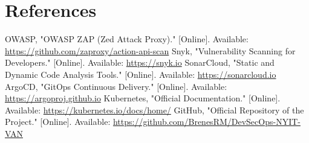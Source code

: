 \documentclass[conference]{IEEEtran}
\begin{document}
\section{References}
\begin{thebibliography}{1}
     OWASP, "OWASP ZAP (Zed Attack Proxy)." [Online]. Available: \url{https://github.com/zaproxy/action-api-scan}
     Snyk, "Vulnerability Scanning for Developers." [Online]. Available: \url{https://snyk.io}
     SonarCloud, "Static and Dynamic Code Analysis Tools." [Online]. Available: \url{https://sonarcloud.io}
     ArgoCD, "GitOps Continuous Delivery." [Online]. Available: \url{https://argoproj.github.io}
     Kubernetes, "Official Documentation." [Online]. Available: \url{https://kubernetes.io/docs/home/}
     GitHub, "Official Repository of the Project." [Online]. Available: \url{https://github.com/BrenesRM/DevSecOps-NYIT-VAN}
\end{thebibliography}
\end{document}
